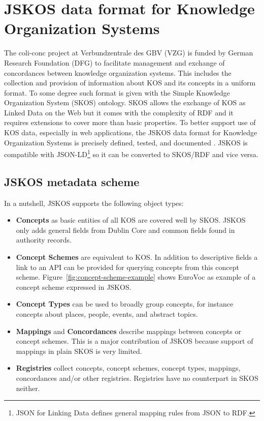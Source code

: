 \documentclass[12pt,a4paper]{llncs}
\begin{document}
\vfill

\section{JSKOS data format for Knowledge Organization Systems}
\label{sec:jskos}
The coli-conc project at Verbundzentrale des GBV (VZG) is funded by German Research Foundation (DFG) to facilitate management and exchange of concordances between knowledge organization systems. This includes the collection and provision of information about KOS and its concepts in a uniform format. To some degree such format is given with the Simple Knowledge Organization System (SKOS) ontology.  SKOS allows the exchange of KOS as Linked Data on the Web but it comes with the complexity of RDF and it requires extensions to cover more than basic properties.
To better support use of KOS data, especially in web applications, the JSKOS data format for Knowledge Organization Systems is precisely defined, tested, and documented \cite{JSKOS}. JSKOS is compatible with JSON-LD\footnote{JSON for Linking Data defines general mapping rules from JSON to RDF.} so it can be converted to SKOS/RDF and vice versa. 

\pagebreak

\subsection{JSKOS metadata scheme}
In a nutshell, JSKOS supports the following object types:

\begin{itemize}

\item \textbf{Concepts} as basic entities of all KOS are covered well by SKOS. JSKOS only adds general fields from Dublin Core and common fields found in authority records.

\item \textbf{Concept Schemes} are equivalent to KOS. In addition to descriptive  fields a link to an API can be provided for querying concepts from this concept scheme.
Figure~\ref{fig:concept-scheme-example} shows EuroVoc as example of a concept scheme  expressed in JSKOS.

\item \textbf{Concept Types} can be used to broadly group concepts, for instance  concepts about places, people, events, and abstract topics.

\item \textbf{Mappings} and \textbf{Concordances} describe mappings between concepts or concept schemes. This is a major contribution of JSKOS because support of mappings in plain SKOS is very limited.

\item \textbf{Registries} collect concepts, concept schemes, concept types, mappings, concordances and/or other registries. Registries have no counterpart in SKOS neither.
\end{itemize}
\end{document}
